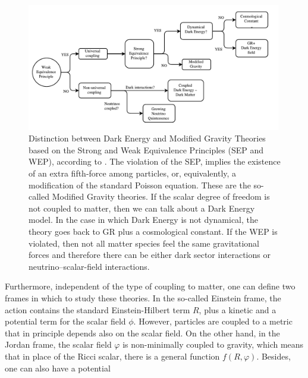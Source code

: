 \begin{figure}[htbp]
	\begin{center}
		\includegraphics[width=0.99\textwidth]
		{Figures/DE-MG.pdf}
	\end{center}
	\caption[Dark Energy - Modified Gravity Flowchart]{Distinction between Dark Energy and
		Modified Gravity Theories based on the Strong and Weak Equivalence Principles (SEP and WEP), according to \cite{joyce_dark_2016-2}.
		The violation of the SEP, implies the existence of an extra fifth-force among particles, 
		or, equivalently, a modification of the standard Poisson equation. These are the so-called Modified Gravity theories.
		If the scalar degree of freedom is not coupled to matter, then we can talk about a Dark Energy model.
		In the case in which Dark Energy is not dynamical, the theory goes back to GR plus a cosmological constant.
		If the WEP is violated, then not all matter species feel the same gravitational forces and therefore
		there can be either dark sector interactions or neutrino--scalar-field interactions.
	}\label{fig:DE-vs-MG-WEP-SEP}
\end{figure}
Furthermore, independent of the type of coupling to matter,
one can define two frames in which to study these theories. 
In the so-called Einstein frame, the action contains the standard Einstein-Hilbert term $R$,
plus a kinetic and a potential term for the scalar field $\phi$. 
However, particles are coupled to a metric that in principle depends also on the scalar field. 
On the other hand, in the Jordan frame, the scalar field $\varphi$ is non-minimally coupled
to gravity, which means that in place of the Ricci scalar,
there is a general function $f(R,\varphi)$. Besides, one can also have a potential
